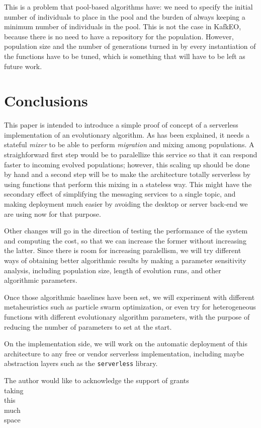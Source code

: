 \documentclass[sigconf]{acmart}
\begin{document}
This is a problem that pool-based algorithms have: we need to
specify the initial number of individuals to place in the pool and the
burden of always keeping a minimum number of individuals in the pool. This
is not the case in KafkEO, because there is no need to have a
repository for the population. However, population size and the number
of generations turned in by every instantiation of the functions have
to be tuned, which is something that will have to be left as future
work.


\section{Conclusions}
\label{sec:con}


This paper is intended to introduce a simple proof of concept of a
serverless implementation of an evolutionary algorithm. As has been
explained, it needs a stateful {\em mixer} to be able to perform {\em
  migration} and mixing among populations. A straighforward first step
would be to paralellize this service so that it can respond faster to
incoming evolved populations; however, this scaling up should be done
by hand and a second step will be to make the architecture totally
serverless by using functions that perform this mixing in a stateless
way. This might have the secondary effect of simplifying the messaging
services to a single topic, and making deployment much easier by
avoiding the desktop or server back-end we are using now for that
purpose.

Other changes will go in the direction of testing the performance of
the system and computing the cost, so that we can increase the former
without increasing the latter. Since there is room for increasing
paralellism, we will try different ways of obtaining better
algorithmic results by making a parameter sensitivity analysis,
including population size, length of evolution runs, and other
algorithmic parameters.

Once those algorithmic baselines have been set, we will experiment
with different metaheuristics such as particle swarm optimization, or
even try for heterogeneous functions with different evolutionary
algorithm parameters, with the purpose of reducing the number of
parameters to set at the start.

On the implementation side, we will work on the automatic deployment
of this architecture to any free or vendor serverless implementation,
including maybe abstraction layers such as the {\tt serverless}
library. 




\begin{acks}

  The author would like to acknowledge the support of grants\\
  taking\\
  this\\
  much\\
  space\\

\end{acks}




\end{document}
